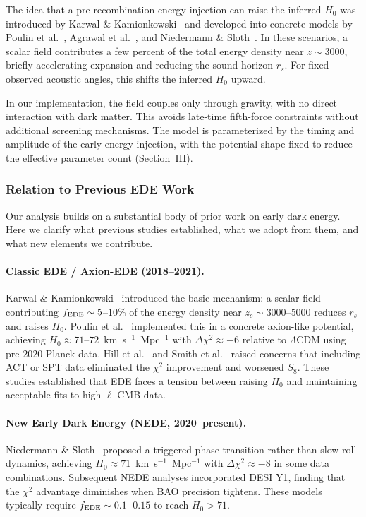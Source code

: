 \documentclass[a4paper,11pt]{article}
\begin{document}
The idea that a pre-recombination energy injection can raise the inferred $H_0$ was introduced by Karwal \& Kamionkowski~\cite{Karwal_Kamionkowski} and developed into concrete models by Poulin et al.~\cite{Poulin_EDE}, Agrawal et al.~\cite{Agrawal_RnR}, and Niedermann \& Sloth~\cite{Niedermann_NewEDE}. In these scenarios, a scalar field contributes a few percent of the total energy density near $z \sim 3000$, briefly accelerating expansion and reducing the sound horizon $r_s$. For fixed observed acoustic angles, this shifts the inferred $H_0$ upward.

In our implementation, the field couples only through gravity, with no direct interaction with dark matter. This avoids late-time fifth-force constraints without additional screening mechanisms. The model is parameterized by the timing and amplitude of the early energy injection, with the potential shape fixed to reduce the effective parameter count (Section~III).

\subsubsection{Relation to Previous EDE Work}

Our analysis builds on a substantial body of prior work on early dark energy. Here we clarify what previous studies established, what we adopt from them, and what new elements we contribute.

\paragraph{Classic EDE / Axion-EDE (2018--2021).}
Karwal \& Kamionkowski~\cite{Karwal_Kamionkowski} introduced the basic mechanism: a scalar field contributing $f_{\rm EDE} \sim 5$--$10\%$ of the energy density near $z_c \sim 3000$--$5000$ reduces $r_s$ and raises $H_0$. Poulin et al.~\cite{Poulin_EDE} implemented this in a concrete axion-like potential, achieving $H_0 \approx 71$--$72$~km~s$^{-1}$~Mpc$^{-1}$ with $\Delta\chi^2 \approx -6$ relative to $\Lambda$CDM using pre-2020 Planck data. Hill et al.~\cite{Hill2020} and Smith et al.~\cite{Smith2020} raised concerns that including ACT or SPT data eliminated the $\chi^2$ improvement and worsened $S_8$. These studies established that EDE faces a tension between raising $H_0$ and maintaining acceptable fits to high-$\ell$ CMB data.

\paragraph{New Early Dark Energy (NEDE, 2020--present).}
Niedermann \& Sloth~\cite{Niedermann_NewEDE} proposed a triggered phase transition rather than slow-roll dynamics, achieving $H_0 \approx 71$~km~s$^{-1}$~Mpc$^{-1}$ with $\Delta\chi^2 \approx -8$ in some data combinations. Subsequent NEDE analyses incorporated DESI Y1, finding that the $\chi^2$ advantage diminishes when BAO precision tightens. These models typically require $f_{\rm EDE} \sim 0.1$--$0.15$ to reach $H_0 > 71$.
\end{document}
